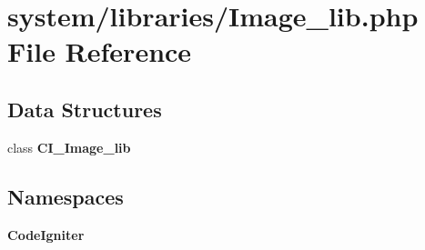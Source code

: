 \section{system/libraries/\-Image\-\_\-lib.php File Reference}
\label{_image__lib_8php}
\subsection*{Data Structures}
\begin{DoxyCompactItemize}
\item 
class {\bf C\-I\-\_\-\-Image\-\_\-lib}
\end{DoxyCompactItemize}
\subsection*{Namespaces}
\begin{DoxyCompactItemize}
\item 
{\bf Code\-Igniter}
\end{DoxyCompactItemize}
